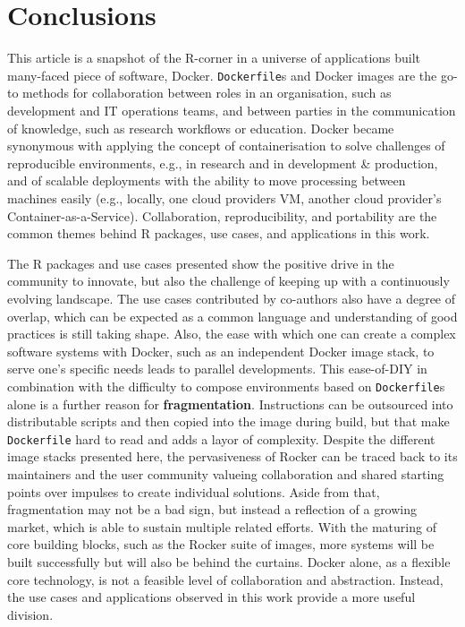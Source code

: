 \hypertarget{conclusions}{%
\section{Conclusions}\label{conclusions}}

This article is a snapshot of the R-corner in a universe of applications
built many-faced piece of software, Docker. \texttt{Dockerfile}s and
Docker images are the go-to methods for collaboration between roles in
an organisation, such as development and IT operations teams, and
between parties in the communication of knowledge, such as research
workflows or education. Docker became synonymous with applying the
concept of containerisation to solve challenges of reproducible
environments, e.g., in research and in development \& production, and of
scalable deployments with the ability to move processing between
machines easily (e.g., locally, one cloud providers VM, another cloud
provider's Container-as-a-Service). Collaboration, reproducibility, and
portability are the common themes behind R packages, use cases, and
applications in this work.

The R packages and use cases presented show the positive drive in the
community to innovate, but also the challenge of keeping up with a
continuously evolving landscape. The use cases contributed by co-authors
also have a degree of overlap, which can be expected as a common
language and understanding of good practices is still taking shape.
Also, the ease with which one can create a complex software systems with
Docker, such as an independent Docker image stack, to serve one's
specific needs leads to parallel developments. This ease-of-DIY in
combination with the difficulty to compose environments based on
\texttt{Dockerfile}s alone is a further reason for
\textbf{fragmentation}. Instructions can be outsourced into
distributable scripts and then copied into the image during build, but
that make \texttt{Dockerfile} hard to read and adds a layor of
complexity. Despite the different image stacks presented here, the
pervasiveness of Rocker can be traced back to its maintainers and the
user community valueing collaboration and shared starting points over
impulses to create individual solutions. Aside from that, fragmentation
may not be a bad sign, but instead a reflection of a growing market,
which is able to sustain multiple related efforts. With the maturing of
core building blocks, such as the Rocker suite of images, more systems
will be built successfully but will also be behind the curtains. Docker
alone, as a flexible core technology, is not a feasible level of
collaboration and abstraction. Instead, the use cases and applications
observed in this work provide a more useful division.


